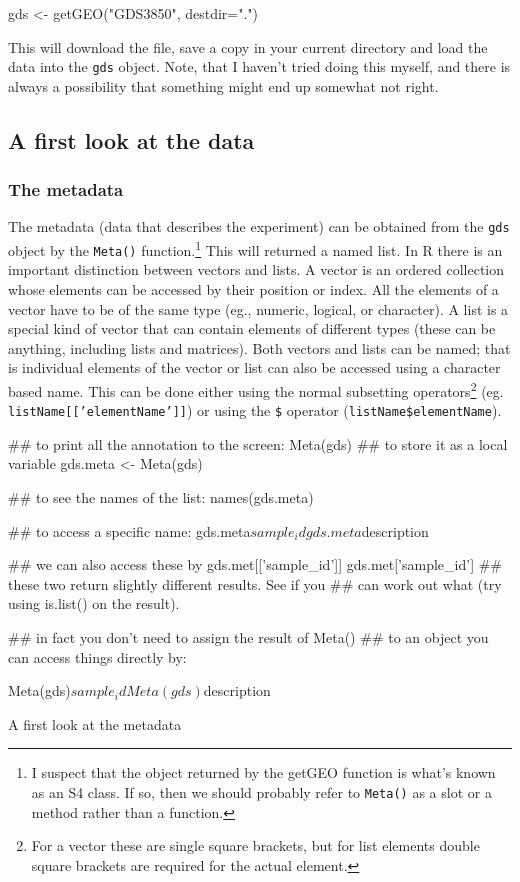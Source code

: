 \documentclass[11pt]{article}
\begin{document}
\begin{rcode}
  gds <- getGEO("GDS3850", destdir=".")
\end{rcode}
This will download the file, save a copy in your current directory
and load the data into the \texttt{gds} object. Note, that I haven't
tried doing this myself, and there is always a possibility that something
might end up somewhat not right.

\subsection{A first look at the data}
\label{sec-1-2}
\subsubsection{The metadata}
\label{sec-1-2-1}
The metadata (data that describes the experiment) can be obtained from the
\texttt{gds} object by the \texttt{Meta()} function.\footnote{I suspect that
the object returned by the getGEO function is what's known as an S4 class.
If so, then we should probably refer to \texttt{Meta()} as a slot or a method
rather than a function.} This will returned a named list. In R there is
an important distinction between vectors and lists. A vector is an ordered
collection whose elements can be accessed by their position or index. All
the elements of a vector have to be of the same type (eg., numeric, logical,
or character). A list is a special kind of vector that can contain
elements of different types (these can be anything, including lists and matrices).
Both vectors and lists can be named; that is individual elements of the vector
or list can also be accessed using a character based name. This can be done
either using the normal subsetting operators\footnote{For a vector these are
single square brackets, but for list elements double square brackets are required
for the actual element.} (eg. \texttt{listName[['elementName']]}) or
using the \texttt{\$} operator (\texttt{listName\$elementName}).

\begin{listing}
\begin{rcode}
  ## to print all the annotation to the screen:
  Meta(gds)
  ## to store it as a local variable
  gds.meta <- Meta(gds)
  
  ## to see the names of the list:
  names(gds.meta)

  ## to access a specific name:
  gds.meta$sample_id
  gds.meta$description

  ## we can also access these by
  gds.met[['sample_id']]
  gds.met['sample_id']
  ## these two return slightly different results. See if you
  ## can work out what (try using is.list() on the result).

  ## in fact you don't need to assign the result of Meta()
  ## to an object you can access things directly by:

  Meta(gds)$sample_id
  Meta(gds)$description
\end{rcode}
\caption{A first look at the metadata}
\label{lis2}
\end{listing}
\end{document}
